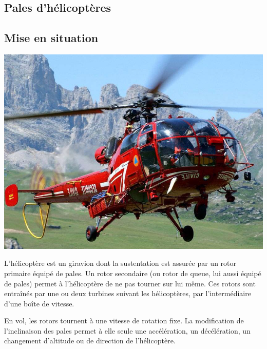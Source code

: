 \documentclass[10pt,fleqn]{article} %
\begin{document}

\vspace{4.4cm}
\pagestyle{fancy}
\thispagestyle{plain}


\def\columnseprulecolor{\color{ocre}}
\setlength{\columnseprule}{0.4pt} 

\ifprof
\else
\begin{multicols}{2}
\fi


\section*{Pales d'hélicoptères}
\subsection*{Mise en situation}
\ifprof
\else
\begin{center}
\includegraphics[width=.7\linewidth]{images/fig1}
\end{center}
L'hélicoptère est un giravion dont la sustentation est assurée par un rotor primaire équipé de pales. Un rotor secondaire (ou rotor de queue, lui aussi équipé de pales) permet à l'hélicoptère de ne pas tourner sur lui même. Ces rotors sont entraînés par une ou deux turbines suivant les hélicoptères, par l'intermédiaire d'une boîte de vitesse. 

En vol, les rotors tournent à une vitesse de rotation fixe. La modification de l'inclinaison des pales permet à elle seule une accélération, un décélération, un changement d'altitude ou de direction de l'hélicoptère.



\end{multicols}
\end{document}
